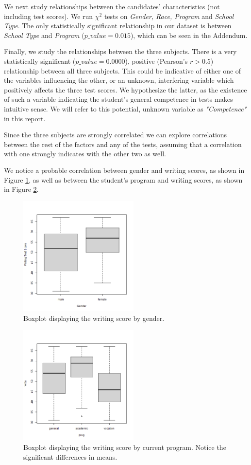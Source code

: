 \documentclass[10pt, a4paper]{article}
\begin{document}
	We next study relationships between the candidates' characteristics (not including test scores). We run $\chi^2$ tests on \textit{Gender, Race, Program} and \textit{School Type}. The only statistically significant relationship in our dataset is between \textit{School Type} and \textit{Program} ($p\_value = 0.015$), which can be seen in the Addendum.
	
	Finally, we study the relationships between the three subjects. There is a very statistically significant ($p\_value = 0.0000$), positive (Pearson's $r > 0.5$) relationship between all three subjects. This could be indicative of either one of the variables influencing the other, or an unknown, interfering variable which positively affects the three test scores. We hypothesize the latter, as the existence of such a variable indicating the student's general competence in tests makes intuitive sense. We will refer to this potential, unknown variable as \textit{"Competence"} in this report.
	
	Since the three subjects are strongly correlated we can explore correlations between the rest of the factors and any of the tests, assuming that a correlation with one strongly indicates with the other two as well. 
	
	We notice a probable correlation between gender and writing scores, as shown in Figure \ref{fig::write_gender}, as well as between the student's program and writing scores, as shown in Figure \ref{fig::write_prog}.
	
	\begin{figure}
		\includegraphics[width=6cm]{write_genre_boxplot.png}
		\centering
		\caption{Boxplot displaying the writing score by gender.}
		\label{fig::write_gender}
	\end{figure}
	
	\begin{figure}
		\includegraphics[width=6cm]{write_prog_boxplot.png}
		\centering
		\caption{Boxplot displaying the writing score by current program. Notice the significant differences in means.}
		\label{fig::write_prog}
	\end{figure}
	
\end{document}
